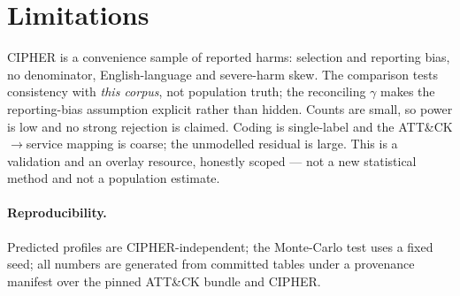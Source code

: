 \documentclass[11pt]{article}
\begin{document}
\section{Limitations}
CIPHER is a convenience sample of reported harms: selection and reporting bias, no
denominator, English-language and severe-harm skew. The comparison tests
consistency with \emph{this corpus}, not population truth; the reconciling $\gamma$
makes the reporting-bias assumption explicit rather than hidden. Counts are small,
so power is low and no strong rejection is claimed. Coding is single-label and the
ATT\&CK$\to$service mapping is coarse; the unmodelled residual is large. This is a
validation and an overlay resource, honestly scoped --- not a new statistical
method and not a population estimate.

\paragraph{Reproducibility.} Predicted profiles are CIPHER-independent; the
Monte-Carlo test uses a fixed seed; all numbers are generated from committed
tables under a provenance manifest over the pinned ATT\&CK bundle and CIPHER.
\end{document}

